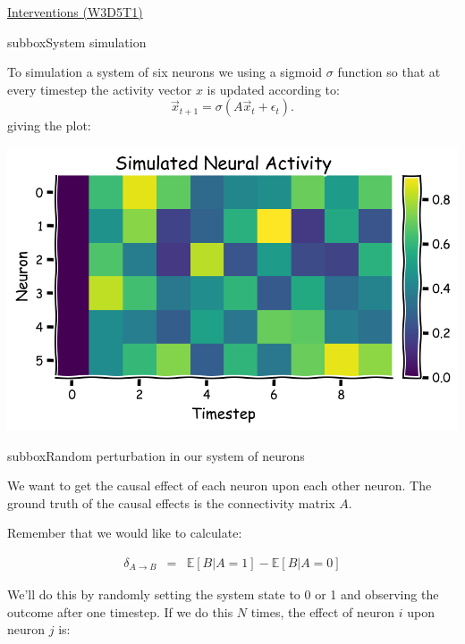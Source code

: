 \begin{textbox}{\href{https://compneuro.neuromatch.io/tutorials/W3D5_NetworkCausality/student/W3D5_Tutorial1.html}{Interventions (W3D5T1)}   }
\begin{subbox}{subbox}{System simulation}
\scriptsize


To simulation a system of six neurons we using a sigmoid $\sigma$ function so that at every timestep the activity vector $x$ is updated according to: 
\begin{equation*}
\vec{x}_{t+1} = \sigma(A\vec{x}_t + \epsilon_t).
\end{equation*}
giving the plot:

\begin{center}
    
\includegraphics[scale=0.2]{Figures/NC/NC_Figure2.png}
\end{center}
\end{subbox}
\begin{subbox}{subbox}{Random perturbation in our system of neurons}
\scriptsize

We want to get the causal effect of each neuron upon each other neuron. The ground truth of the causal effects is the connectivity matrix $A$.

Remember that we would like to calculate:

\begin{eqnarray*}
\delta_{A\to B} &=& \mathbb{E}[B | A=1] -  \mathbb{E}[B | A=0] 
\end{eqnarray*}


We'll do this by randomly setting the system state to 0 or 1 and observing the outcome after one timestep. If we do this $N$ times, the effect of neuron $i$ upon neuron $j$ is:


\end{subbox}
\end{textbox}
